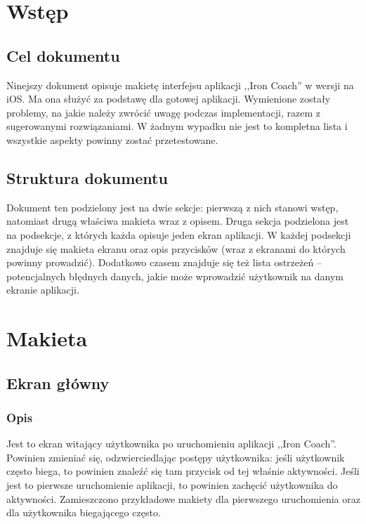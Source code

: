 

\setcounter{tocdepth}{2}
\tableofcontents
\clearpage
\section{Wstęp}
\subsection{Cel dokumentu}
\noindent Ninejszy dokument opisuje makietę interfejsu aplikacji ,,Iron Coach'' w wersji na iOS. Ma ona służyć za podstawę dla gotowej aplikacji. Wymienione zostały problemy, na jakie należy zwrócić uwagę podczas implementacji, razem z sugerowanymi rozwiązaniami. W żadnym wypadku nie jest to kompletna lista i wszystkie aspekty powinny zostać przetestowane.
\subsection{Struktura dokumentu}
\noindent Dokument ten podzielony jest na dwie sekcje: pierwszą z nich stanowi wstęp, natomiast drugą właściwa makieta wraz z opisem. Druga sekcja podzielona jest na podsekcje, z których każda opisuje jeden ekran aplikacji. W każdej podsekcji znajduje się makieta ekranu oraz opis przycisków (wraz z ekranami do których powinny prowadzić). Dodatkowo czasem znajduje się też lista ostrzeżeń -- potencjalnych błędnych danych, jakie może wprowadzić użytkownik na danym ekranie aplikacji.
\section{Makieta}
\subsection{Ekran główny}
\subsubsection{Opis}
\noindent Jest to ekran witający użytkownika po uruchomieniu aplikacji ,,Iron Coach''. Powinien zmieniać się, odzwierciedlając postępy użytkownika: jeśli użytkownik często biega, to powinien znaleźć się tam przycisk od tej właśnie aktywności. Jeśli jest to pierwsze uruchomienie aplikacji, to powinien zachęcić użytkownika do aktywności. Zamieszczono przykładowe makiety dla pierwszego uruchomienia oraz dla użytkownika biegającego często.
